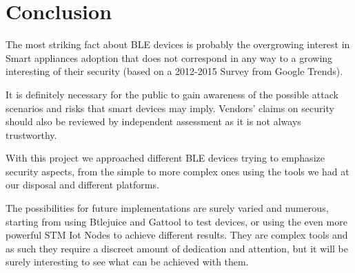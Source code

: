 \chapter{Conclusion}
\label{chapter6}
\thispagestyle{empty}

\noindent The most striking fact about BLE devices is probably the overgrowing interest in Smart appliances adoption that does not correspond in any way to a growing interesting of their security (based on a 2012-2015 Survey from Google Trends).

It is definitely necessary for the public to gain awareness of the possible attack scenarios and risks that smart devices may imply.
Vendors' claims on security should also be reviewed by independent assessment as it is not always trustworthy.

With this project we approached different BLE devices trying to emphasize security aspects, from the simple to more complex ones using the tools we had at our disposal and different platforms.

The possibilities for future implementations are surely varied and numerous, starting from using Btlejuice and Gattool to test devices, or using the even more powerful STM Iot Nodes to achieve different results.
They are complex tools and as such they require a discreet amount of dedication and attention, but it will be surely interesting to see what can be achieved with them. 